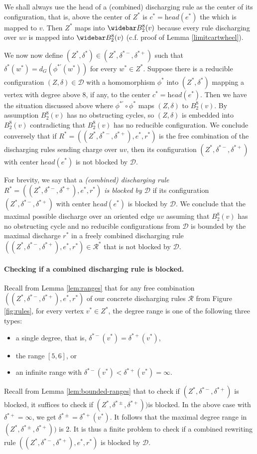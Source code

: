 \documentclass[10pt,a4paper]{article}
\renewcommand{\bar}{\widebar}
\def\head{\textit{head}}
\def\cR{{\mathcal R}}
\def\cD{{\mathcal D}}
\begin{document}
We shall always use the head of a  (combined) discharging rule as the center 
of its configuration, that is, above
the center of $Z^*$ is $c^*=\head(e^*)$ the
which is mapped to $v$. Then $Z^*$ maps into
$\bar B^8_2(v)$ because every rule discharging
over $uv$ is mapped into $\bar B^8_2(v)$ (c.f. proof of Lemma \ref{limitcartwheel}).


We now now define $(Z^*,\delta^*)\in (Z^*,\delta^{*-},\delta^{*+})$ such that 
$\delta^*(w^*)=d_G(\phi^{*\prime}(w^*))$
for every $w^*\in Z^*$.
Suppose there is a reducible configuration
$(Z,\delta)\in \cD$ with a homomorphism $\phi^*$ into $(Z^*,\delta^*)$ mapping a vertex with degree above 8, if any, to the center $c^*=\head(e^*)$. Then we have the situation discussed above where $\phi^{*\prime}\circ \phi^*$ maps $(Z,\delta)$ to $B^8_2(v)$.
By assumption $B^8_2(v)$
has no obstructing cycles, so $(Z,\delta)$ is embedded into $B^8_2(v)$ contradicting
that $B^8_2(v)$ has no reducible configuration. We conclude conversely that if $R^*=((Z^*,\delta^{*-},\delta^{*+}),e^*,r^*)$ is the free combination of the discharging rules sending charge over $uv$, then its configuration  $(Z^*,\delta^{*-},\delta^{*+})$ with center $\head(e^*)$ is not blocked by $\cD$. 

For brevity, we say that a \emph{(combined)
discharging rule $R^*=((Z^*,\delta^{*-},\delta^{*+}),e^*,r^*)$ is blocked by $\cD$} if
its configuration  $(Z^*,\delta^{*-},\delta^{*+})$ with center $\head(e^*)$ is blocked by $\cD$. 
We conclude that
the maximal possible discharge
over an oriented edge $uv$ assuming that $B^8_2(v)$ has no obstructing cycle and no reducible configurations
from $\cD$ is bounded by the maximal
discharge $r^*$ in a freely combined discharging rule $((Z^*,\delta^{*-},\delta^{*+}),e^*,r^*)\in \cR^*$ 
that is not blocked by $\cD$.

\paragraph{Checking if a combined discharging rule is blocked.}
Recall from Lemma \ref{lem:ranges} that for any free combination  $((Z^*,\delta^{*-},\delta^{*+}),e^*,r^*)$
of our concrete discharging rules $\cR$ from Figure \ref{fig:rules}, for every vertex 
$v^*\in Z^*$, the degree range is one of the following three types:
\begin{itemize}
    \item a single degree, that is, 
    $\delta^{*-}(v^*)=\delta^{*+}(v^*)$,
    \item the range $[5,6]$, or
    \item an infinite range with $\delta^{*-}(v^*)<\delta^{*+}(v^*)=\infty$.
\end{itemize}
Recall from Lemma \ref {lem:bounded-ranges} that to check if 
$(Z^*,\delta^{*-},\delta^{*+})$ is blocked, it suffices
to check if $(Z^*,\delta^{*\pm},\delta^{*+}))$is blocked. In the above case with  $\delta^{*+}=\infty$, we get $\delta^{*\pm}=\delta^{*+}(v^*)$. It follows that the maximal degree range in 
$(Z^*,\delta^{*\pm},\delta^{*+}))$
is 2. It is thus a finite problem to check if a combined rewriting
rule $((Z^*,\delta^{*-},\delta^{*+}),e^*,r^*)$ is blocked by $\cD$.
\end{document}
